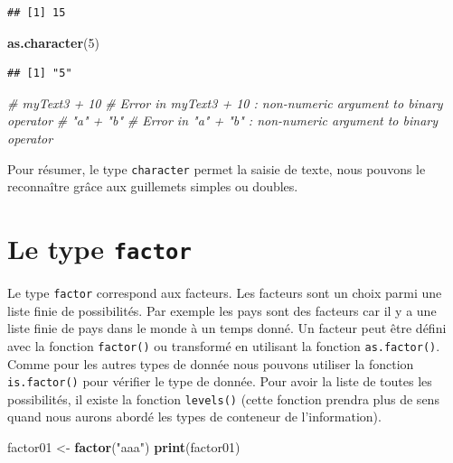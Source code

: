 \documentclass[twoside,symmetric]{book}
\newenvironment{Shaded}{}{}
\newcommand{\CommentTok}[1]{\textit{#1}}
\newcommand{\DecValTok}[1]{#1}
\newcommand{\KeywordTok}[1]{\textbf{#1}}
\newcommand{\NormalTok}[1]{#1}
\newcommand{\StringTok}[1]{#1}
\begin{document}
\begin{verbatim}
## [1] 15
\end{verbatim}

\begin{Shaded}
\begin{Highlighting}[]
\KeywordTok{as.character}\NormalTok{(}\DecValTok{5}\NormalTok{)}
\end{Highlighting}
\end{Shaded}

\begin{verbatim}
## [1] "5"
\end{verbatim}

\begin{Shaded}
\begin{Highlighting}[]
\CommentTok{# myText3 + 10 }
\CommentTok{# Error in myText3 + 10 : non-numeric argument to binary operator}
\CommentTok{# "a" + "b" }
\CommentTok{# Error in "a" + "b" : non-numeric argument to binary operator}
\end{Highlighting}
\end{Shaded}

Pour résumer, le type \texttt{character} permet la saisie de texte, nous pouvons le reconnaître grâce aux guillemets simples ou doubles.

\hypertarget{le-type-factor}{%
\section{\texorpdfstring{Le type \texttt{factor}}{Le type factor}}\label{le-type-factor}}

Le type \texttt{factor} correspond aux facteurs. Les facteurs sont un choix parmi une liste finie de possibilités. Par exemple les pays sont des facteurs car il y a une liste finie de pays dans le monde à un temps donné. Un facteur peut être défini avec la fonction \texttt{factor()} ou transformé en utilisant la fonction \texttt{as.factor()}. Comme pour les autres types de donnée nous pouvons utiliser la fonction \texttt{is.factor()} pour vérifier le type de donnée. Pour avoir la liste de toutes les possibilités, il existe la fonction \texttt{levels()} (cette fonction prendra plus de sens quand nous aurons abordé les types de conteneur de l'information).

\begin{Shaded}
\begin{Highlighting}[]
\NormalTok{factor01 <-}\StringTok{ }\KeywordTok{factor}\NormalTok{(}\StringTok{"aaa"}\NormalTok{)}
\KeywordTok{print}\NormalTok{(factor01)}
\end{Highlighting}
\end{Shaded}
\end{document}
